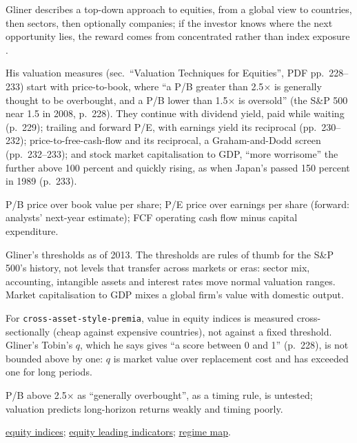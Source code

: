 \begin{qfmethod}\label{meth:equity-index-valuation}
 Gliner describes a top-down approach to equities, from a global view to countries, then sectors, then optionally companies; if the investor knows where the next opportunity lies, the reward comes from concentrated rather than index exposure \citep[chap.~8, sec.\ ``Taking a Top-Down Macro Approach'', PDF pp.~215--216, Figure~8.1]{s7-gliner}.

His valuation measures (sec.\ ``Valuation Techniques for Equities'', PDF pp.~228--233) start with price-to-book, where ``a P/B greater than 2.5$\times$ is generally thought to be overbought, and a P/B lower than 1.5$\times$ is oversold'' (the S\&P 500 near 1.5 in 2008, p.~228). They continue with dividend yield, paid while waiting (p.~229); trailing and forward P/E, with earnings yield its reciprocal (pp.~230--232); price-to-free-cash-flow and its reciprocal, a Graham-and-Dodd screen (pp.~232--233); and stock market capitalisation to GDP, ``more worrisome'' the further above 100 percent and quickly rising, as when Japan's passed 150 percent in 1989 (p.~233).

 P/B price over book value per share; P/E price over earnings per share (forward: analysts' next-year estimate); FCF operating cash flow minus capital expenditure.

 Gliner's thresholds as of 2013. The thresholds are rules of thumb for the S\&P 500's history, not levels that transfer across markets or eras: sector mix, accounting, intangible assets and interest rates move normal valuation ranges. Market capitalisation to GDP mixes a global firm's value with domestic output.

 For \nolinkurl{cross-asset-style-premia}, value in equity indices is measured cross-sectionally (cheap against expensive countries), not against a fixed threshold. Gliner's Tobin's $q$, which he says gives ``a score between 0 and 1'' (p.~228), is not bounded above by one: $q$ is market value over replacement cost and has exceeded one for long periods.

 P/B above 2.5$\times$ as ``generally overbought'', as a timing rule, is untested; valuation predicts long-horizon returns weakly and timing poorly.

 \hyperref[def:equity-indices-derivatives]{equity indices}; \hyperref[meth:equity-macro-leading-indicators]{equity leading indicators}; \hyperref[def:macro-regime-asset-map]{regime map}.


\end{qfmethod}
